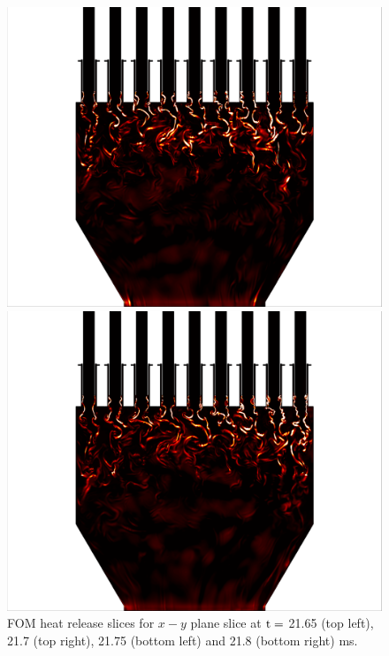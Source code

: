 \begin{figure}
	\begin{minipage}{0.49\linewidth}
		\includegraphics[width=0.99\linewidth,trim={0.5em 0em 6cm 0em},clip]{Chapters/HPROMResults/Images/nineElem/example_snaps/example_heat_z_217500.png}
	\end{minipage}
	\begin{minipage}{0.49\linewidth}
		\includegraphics[width=0.99\linewidth,trim={6cm 0em 0.5em 0em},clip]{Chapters/HPROMResults/Images/nineElem/example_snaps/example_heat_z_218000.png}
	\end{minipage}
	\caption{\label{fig:nineElemFOMHeat}FOM heat release slices for $x-y$ plane slice at $\text{t} = $ 21.65 (top left), 21.7 (top right), 21.75 (bottom left) and 21.8 (bottom right) ms.}
\end{figure}


